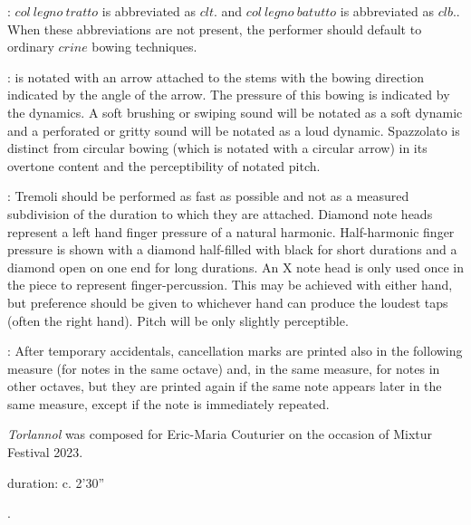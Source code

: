 \documentclass[11pt]{article}
\newcommand*\circled[1]{\tikz[baseline=(char.base)]{
            \node[shape=circle,draw,inner sep=1pt] (char) {#1};}}
\begin{document}
 : \circled{1} $col \ legno \ tratto$ is abbreviated as $clt.$ and \circled{2} $col \ legno \ batutto$ is abbreviated as $clb.$. When these abbreviations are not present, the performer should default to ordinary $crine$ bowing techniques.
\rightskip\leftskip
\phantom{text} \hfill \phantom{()}

 : is notated with an arrow attached to the stems with the bowing direction indicated by the angle of the arrow. The pressure of this bowing is indicated by the dynamics. A soft brushing or swiping sound will be notated as a soft dynamic and a perforated or gritty sound will be notated as a loud dynamic. Spazzolato is distinct from circular bowing (which is notated with a circular arrow) in its overtone content and the perceptibility of notated pitch.
\rightskip\leftskip
\phantom{text} \hfill \phantom{()}

 : \circled{1} Tremoli should be performed as fast as possible and not as a measured subdivision of the duration to which they are attached. \circled{2} Diamond note heads represent a left hand finger pressure of a natural harmonic. \circled{3} Half-harmonic finger pressure is shown with a diamond half-filled with black for short durations and a diamond open on one end for long durations. \circled{4} An X note head is only used once in the piece to represent finger-percussion. This may be achieved with either hand, but preference should be given to whichever hand can produce the loudest taps (often the right hand). Pitch will be only slightly perceptible.
\rightskip\leftskip
\phantom{text} \hfill \phantom{()}

 : After temporary accidentals, cancellation marks are printed also in the following measure (for notes in the same octave) and, in the same measure, for notes in other octaves, but they are printed again if the same note appears later in the same measure, except if the note is immediately repeated.
\rightskip\leftskip
\phantom{text} \hfill \phantom{()}

\vspace*{15\baselineskip}

\begin{center}
\textit{Torlannol} was composed for Eric-Maria Couturier on the occasion of Mixtur Festival 2023.
\end{center}

\vspace*{10\baselineskip}

\begin{center}
duration: c. 2'30''
\end{center}

\vspace*{10\baselineskip}
.
\end{document}
